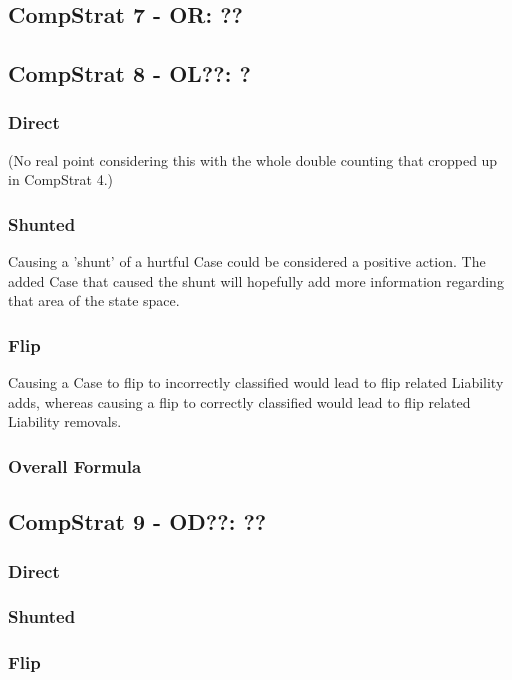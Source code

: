 \documentclass[a4paper,11pt]{report}
\begin{document}
\subsection{CompStrat 7 - OR: ??}
\subsection{CompStrat 8 - OL??: ?}
\subsubsection{Direct}
(No real point considering this with the whole double counting that cropped up in CompStrat 4.)

\subsubsection{Shunted}
Causing a 'shunt' of a hurtful Case could be considered a positive action. The added Case that caused the shunt will hopefully add more information regarding that area of the state space. 

\subsubsection{Flip}
Causing a Case to flip to incorrectly classified would lead to flip related Liability adds, whereas causing a flip to correctly classified would lead to flip related Liability removals. 

\subsubsection{Overall Formula}

\subsection{CompStrat 9 - OD??: ??}

\subsubsection{Direct}

\subsubsection{Shunted}

\subsubsection{Flip}
\end{document}
